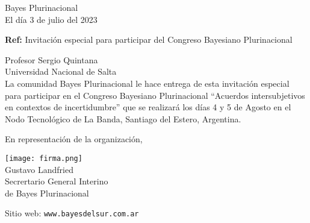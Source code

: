 \documentclass[a4paper,11pt]{letter}
\begin{document}
\begin{letter}{\phantom{.}}


\begin{flushright}
Bayes Plurinacional \\
El día 3 de julio del 2023
\end{flushright}

\vspace{1cm}
\noindent

\hfill \textbf{Ref:} Invitación especial para participar del Congreso Bayesiano Plurinacional\\

\vspace{1cm}

\noindent Profesor Sergio Quintana\\
\noindent Universidad Nacional de Salta\\ [0.3cm]


\hspace{1cm} La comunidad Bayes Plurinacional le hace entrega de esta invitación especial para participar en el Congreso Bayesiano Plurinacional ``Acuerdos intersubjetivos en contextos de incertidumbre'' que se realizará los días 4 y 5 de Agosto en el Nodo Tecnológico de La Banda, Santiago del Estero, Argentina.

\vspace{0.3cm}

\hspace{1cm} En representación de la organización,


\begin{flushleft}
\hfill \texttt{[image: firma.png]}\hspace{2cm}\phantom{.} \\[0cm]
\hfill Gustavo Landfried \hspace{2.5cm}\phantom{.}\\ \small
\hfill Secrertario General Interino \hspace{2.5cm}\phantom{.}\\
\hfill de Bayes Plurinacional \hspace{2.5cm}\phantom{.}\\
\end{flushleft}



 \vspace{0.8cm}
\small

 Sitio web: \texttt{www.bayesdelsur.com.ar}



 \end{letter}
\end{document}
